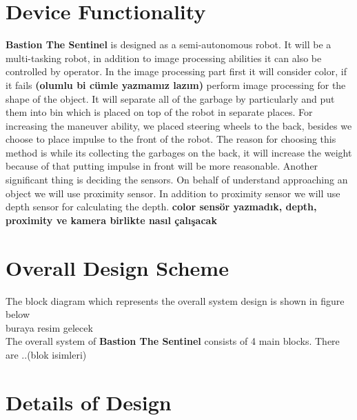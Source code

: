 \documentclass[12pt,a4paper]{article}
\begin{document}
\section{Device Functionality}
 \begin{flushleft}
  \textbf{Bastion The Sentinel} is designed as a semi-autonomous robot. It will be a multi-tasking robot, in addition to 
  image processing abilities it can also be controlled by operator. In the image processing part first it will consider color, 
  if it fails \textbf{(olumlu bi cümle yazmamız lazım)} perform image processing for the shape of the object. It will separate 
  all of the garbage by particularly and put them into bin which is placed on top of the robot in separate places. For increasing 
  the maneuver ability, we placed steering wheels to the back, besides we choose to place impulse to the front of the robot. The 
  reason for choosing this method is while its collecting the garbages on the back, it will increase the weight because of that 
  putting impulse in front will be more reasonable. Another significant thing is deciding the sensors. On behalf of understand 
  approaching an object we will use proximity sensor. In addition to proximity sensor we will use depth sensor for calculating 
  the depth. \textbf{color sensör yazmadık, depth, proximity ve kamera birlikte nasıl çalışacak}
 \end{flushleft}
 
 \section{Overall Design Scheme}
 \begin{flushleft}
  The block diagram which represents the overall system design is shown in figure below\\
  buraya resim gelecek\\
  The overall system of \textbf{Bastion The Sentinel} consists of 4 main blocks. There are ..(blok isimleri)
 \end{flushleft}
 
 \section{Details of Design}
  
\end{document}
